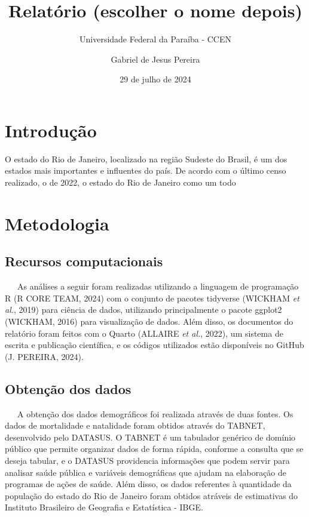 \documentclass[
  12pt,
  letterpaper,
  DIV=11,
  numbers=noendperiod]{scrreprt}
\title{Relatório (escolher o nome depois)}
\subtitle{Universidade Federal da Paraíba - CCEN}
\author{Gabriel de Jesus Pereira}
\date{29 de julho de 2024}
\begin{document}
\maketitle

\chapter{Introdução}\label{introduuxe7uxe3o}

O estado do Rio de Janeiro, localizado na região Sudeste do Brasil, é um
dos estados mais importantes e influentes do país. De acordo com o
último censo realizado, o de 2022, o estado do Rio de Janeiro como um
todo

\chapter{Metodologia}\label{metodologia}

\section{Recursos computacionais}\label{recursos-computacionais}

~~~As análises a seguir foram realizadas utilizando a linguagem de
programação R (R CORE TEAM, 2024) com o conjunto de pacotes tidyverse
(WICKHAM \emph{et al.}, 2019) para ciência de dados, utilizando
principalmente o pacote ggplot2 (WICKHAM, 2016) para visualização de
dados. Além disso, os documentos do relatório foram feitos com o Quarto
(ALLAIRE \emph{et al.}, 2022), um sistema de escrita e publicação
científica, e os códigos utilizados estão disponíveis no GitHub (J.
PEREIRA, 2024).

\section{Obtenção dos dados}\label{obtenuxe7uxe3o-dos-dados}

~~~A obtenção dos dados demográficos foi realizada através de duas
fontes. Os dados de mortalidade e natalidade foram obtidos através do
TABNET, desenvolvido pelo DATASUS. O TABNET é um tabulador genérico de
domínio público que permite organizar dados de forma rápida, conforme a
consulta que se deseja tabular, e o DATASUS providencia informações que
podem servir para analisar saúde pública e variáveis demográficas que
ajudam na elaboração de programas de ações de saúde. Além disso, os
dados referentes à quantidade da população do estado do Rio de Janeiro
foram obtidos atráveis de estimativas do Instituto Brasileiro de
Geografia e Estatística - IBGE.
\end{document}
